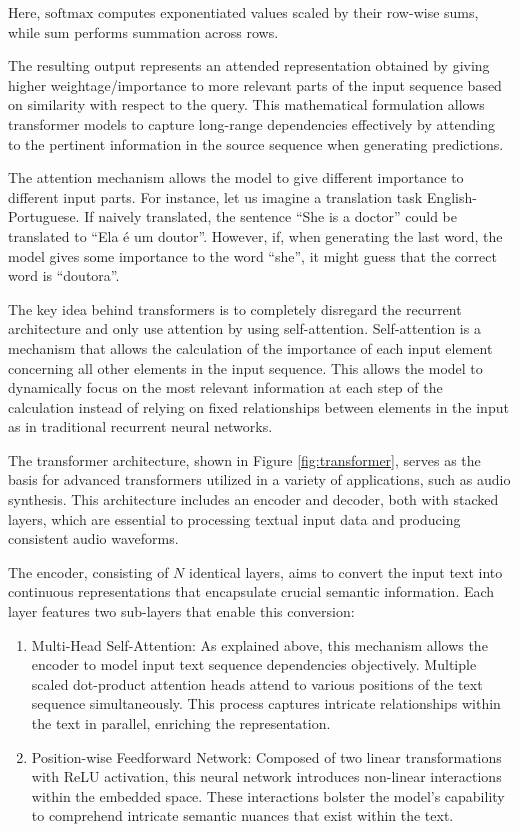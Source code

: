 Here, $\text{softmax}$ computes exponentiated values scaled by their row-wise sums, while $\text{sum}$ performs summation across rows.

The resulting output represents an attended representation obtained by giving higher weightage/importance to more relevant parts of the input sequence based on similarity with respect to the query. This mathematical formulation allows transformer models to capture long-range dependencies effectively by attending to the pertinent information in the source sequence when generating predictions.

The attention mechanism allows the model to give different importance to different input parts. For instance, let us imagine a translation task English-Portuguese. If naively translated, the sentence ``She is a doctor'' could be translated to ``Ela é um doutor''. However, if, when generating the last word, the model gives some importance to the word ``she'', it might guess that the correct word is ``doutora''.

The key idea behind transformers is to completely disregard the recurrent architecture and only use attention by using self-attention. Self-attention is a mechanism that allows the calculation of the importance of each input element concerning all other elements in the input sequence. This allows the model to dynamically focus on the most relevant information at each step of the calculation instead of relying on fixed relationships between elements in the input as in traditional recurrent neural networks.


The transformer architecture, shown in Figure \ref{fig:transformer}, serves as the basis for advanced transformers utilized in a variety of applications, such as audio synthesis. This architecture includes an encoder and decoder, both with stacked layers, which are essential to processing textual input data and producing consistent audio waveforms.

The encoder, consisting of $N$ identical layers, aims to convert the input text into continuous representations that encapsulate crucial semantic information. Each layer features two sub-layers that enable this conversion:

\begin{enumerate}
    \item Multi-Head Self-Attention: As explained above, this mechanism allows the encoder to model input text sequence dependencies objectively. Multiple scaled dot-product attention heads attend to various positions of the text sequence simultaneously. This process captures intricate relationships within the text in parallel, enriching the representation.
    \item Position-wise Feedforward Network: Composed of two linear transformations with \ac{ReLU} activation, this neural network introduces non-linear interactions within the embedded space. These interactions bolster the model's capability to comprehend intricate semantic nuances that exist within the text.
\end{enumerate}

